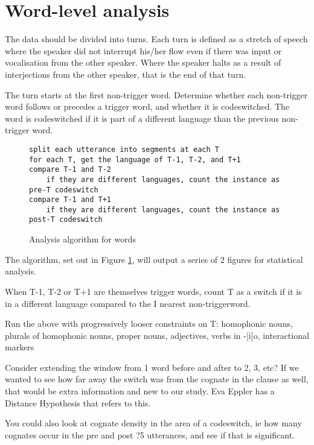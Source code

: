 \documentclass[a4paper,10pt]{article}
\begin{document}
\section{Word-level analysis}

The data should be divided into turns.  Each turn is defined as a stretch of speech where the speaker did not interrupt his/her flow even if there was input or vocalisation from the other speaker.  Where the speaker halts as a result of interjections from the other speaker, that is the end of that turn. 

The turn starts at the first non-trigger word. Determine whether each non-trigger word follows or precedes a trigger word, and whether it is codeswitched. The word is codeswitched if it is part of a different language than the previous non-trigger word. 

\begin{figure}[h]
\begin{BVerbatim}[tabsize=4, fontsize=\relsize{-1}]
split each utterance into segments at each T
for each T, get the language of T-1, T-2, and T+1
compare T-1 and T-2
    if they are different languages, count the instance as pre-T codeswitch
compare T-1 and T+1
    if they are different languages, count the instance as post-T codeswitch
\end{BVerbatim}
\caption{Analysis algorithm for words}
\label{word_algorithm}
\end{figure}

The algorithm, set out in Figure \ref{word_algorithm}, will output a series of 2 figures for statistical analysis.

When T-1, T-2 or T+1 are themselves trigger words, count T as a switch if it is in a different language compared to the I nearest non-triggerword. 

Run the above with progressively looser constraints on T: homophonic nouns, plurals of homophonic nouns, proper nouns, adjectives, verbs in -[i]o, interactional markers

Consider extending the window from 1 word before and after to 2, 3, etc?  If we wanted to see how far away the switch was from the cognate in the clause as well, that would be extra information and new to our study. Eva Eppler has a Distance Hypothesis that refers to this.

You could also look at cognate density in the area of a codeswitch, ie how many cognates occur in the pre and post ?5 utterances, and see if that is significant.
\end{document}
